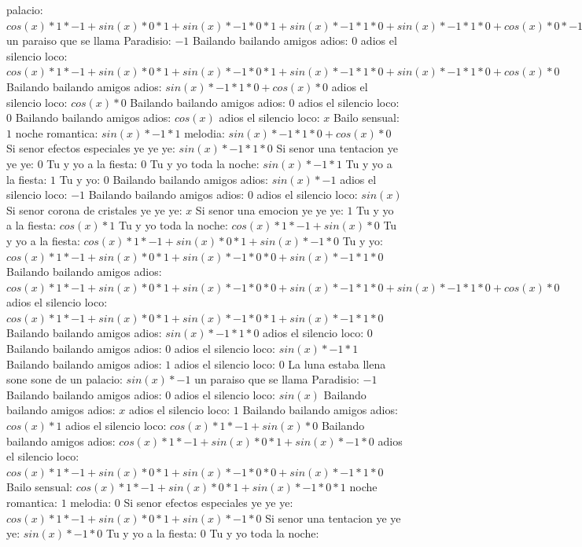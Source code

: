 \documentclass{article}
\begin{document}
palacio: ${{{cos(x)*1*-1+sin(x)*0}*1+sin(x)*-1*0}*1+sin(x)*-1*1*0+sin(x)*-1*1*0+cos(x)*0}*-1$ un paraiso que se llama Paradisio: $-1$ Bailando bailando amigos adios: $0$  \newline adios el silencio loco: ${{cos(x)*1*-1+sin(x)*0}*1+sin(x)*-1*0}*1+sin(x)*-1*1*0+sin(x)*-1*1*0+cos(x)*0$  \newline Bailando bailando amigos adios: $sin(x)*-1*1*0+cos(x)*0$  \newline adios el silencio loco: $cos(x)*0$ Bailando bailando amigos adios: $0$ adios el silencio loco: $0$  \newline Bailando bailando amigos adios: $cos(x)$  \newline adios el silencio loco: $x$ Bailo sensual: $1$  \newline noche romantica: $sin(x)*-1*1$ melodia: $sin(x)*-1*1*0+cos(x)*0$ Si senor efectos especiales ye ye ye: $sin(x)*-1*1*0$ Si senor una tentacion ye ye ye: $0$ Tu y yo a la fiesta: $0$  \newline Tu y yo toda la noche: $sin(x)*-1*1$ Tu y yo a la fiesta: $1$ Tu y yo: $0$  \newline Bailando bailando amigos adios: $sin(x)*-1$ adios el silencio loco: $-1$ Bailando bailando amigos adios: $0$  \newline adios el silencio loco: $sin(x)$  \newline Si senor corona de cristales ye ye ye: $x$ Si senor una emocion ye ye ye: $1$  \newline Tu y yo a la fiesta: $cos(x)*1$ Tu y yo toda la noche: $cos(x)*1*-1+sin(x)*0$ Tu y yo a la fiesta: ${cos(x)*1*-1+sin(x)*0}*1+sin(x)*-1*0$ Tu y yo: ${{cos(x)*1*-1+sin(x)*0}*1+sin(x)*-1*0}*0+sin(x)*-1*1*0$ Bailando bailando amigos adios: ${{cos(x)*1*-1+sin(x)*0}*1+sin(x)*-1*0}*0+sin(x)*-1*1*0+sin(x)*-1*1*0+cos(x)*0$ adios el silencio loco: ${{cos(x)*1*-1+sin(x)*0}*1+sin(x)*-1*0}*1+sin(x)*-1*1*0$  \newline Bailando bailando amigos adios: $sin(x)*-1*1*0$ adios el silencio loco: $0$ Bailando bailando amigos adios: $0$  \newline adios el silencio loco: $sin(x)*-1*1$ Bailando bailando amigos adios: $1$ adios el silencio loco: $0$  \newline La luna estaba llena sone sone de un palacio: $sin(x)*-1$ un paraiso que se llama Paradisio: $-1$ Bailando bailando amigos adios: $0$  \newline adios el silencio loco: $sin(x)$  \newline Bailando bailando amigos adios: $x$ adios el silencio loco: $1$  \newline Bailando bailando amigos adios: $cos(x)*1$ adios el silencio loco: $cos(x)*1*-1+sin(x)*0$ Bailando bailando amigos adios: ${cos(x)*1*-1+sin(x)*0}*1+sin(x)*-1*0$ adios el silencio loco: ${{cos(x)*1*-1+sin(x)*0}*1+sin(x)*-1*0}*0+sin(x)*-1*1*0$ Bailo sensual: ${{cos(x)*1*-1+sin(x)*0}*1+sin(x)*-1*0}*1$ noche romantica: $1$ melodia: $0$  \newline Si senor efectos especiales ye ye ye: ${cos(x)*1*-1+sin(x)*0}*1+sin(x)*-1*0$  \newline Si senor una tentacion ye ye ye: $sin(x)*-1*0$ Tu y yo a la fiesta: $0$ Tu y yo toda la noche: 
\end{document}
